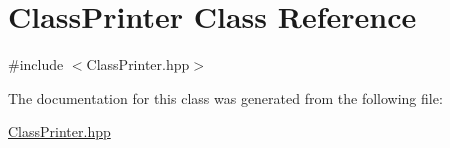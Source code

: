 \hypertarget{class_class_printer}{}\section{Class\+Printer Class Reference}
\label{class_class_printer}


{\ttfamily \#include $<$Class\+Printer.\+hpp$>$}



The documentation for this class was generated from the following file\+:\begin{DoxyCompactItemize}
\item 
\hyperlink{_class_printer_8hpp}{Class\+Printer.\+hpp}\end{DoxyCompactItemize}
